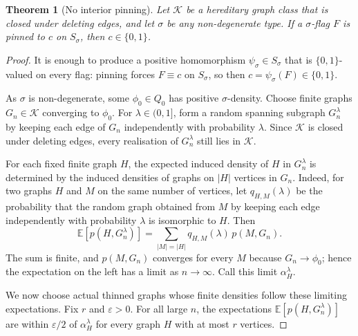 \documentclass[11pt]{article}
\newtheorem{theorem}{Theorem}
\theoremstyle{definition}
\newcommand{\E}{\mathbb{E}}
\newcommand{\K}{\mathcal{K}}
\newcommand{\eps}{\varepsilon}
\begin{document}
\begin{theorem}[No interior pinning]\label{thm:no-interior}
Let $\K$ be a hereditary graph class that is closed under deleting edges, and let $\sigma$
be any non-degenerate type.  If a $\sigma$-flag $F$ is pinned to $c$ on $S_\sigma$, then
$c\in\{0,1\}$.
\end{theorem}

\begin{proof}
It is enough to produce a positive homomorphism $\psi_\sigma\in S_\sigma$ that is
$\{0,1\}$-valued on every flag: pinning forces $F\equiv c$ on $S_\sigma$, so then
$c=\psi_\sigma(F)\in\{0,1\}$.

As $\sigma$ is non-degenerate, some $\phi_0\in Q_0$ has positive $\sigma$-density.  Choose
finite graphs $G_n\in\K$ converging to $\phi_0$.  For $\lambda\in(0,1]$, form a random
spanning subgraph $G_n^\lambda$ by keeping each edge of $G_n$ independently with
probability $\lambda$.  Since $\K$ is closed under deleting edges, every realisation of
$G_n^\lambda$ still lies in $\K$.

For each fixed finite graph $H$, the expected induced density of $H$ in $G_n^\lambda$ is
determined by the induced densities of graphs on $|H|$ vertices in $G_n$.  Indeed, for
two graphs $H$ and $M$ on the same number of vertices, let $q_{H,M}(\lambda)$ be the
probability that the random graph obtained from $M$ by keeping each edge independently
with probability $\lambda$ is isomorphic to $H$.  Then
\[
  \E[p(H,G_n^\lambda)]
  =
  \sum_{|M|=|H|} q_{H,M}(\lambda)\,p(M,G_n).
\]
The sum is finite, and $p(M,G_n)$ converges for every $M$ because $G_n\to\phi_0$; hence
the expectation on the left has a limit as $n\to\infty$.  Call this limit
$\alpha_H^\lambda$.

We now choose actual thinned graphs whose finite densities follow these limiting
expectations.  Fix $r$ and $\eps>0$.  For all large $n$, the expectations
$\E[p(H,G_n^\lambda)]$ are within $\eps/2$ of $\alpha_H^\lambda$ for every graph $H$
with at most $r$ vertices.


\end{proof}
\end{document}
